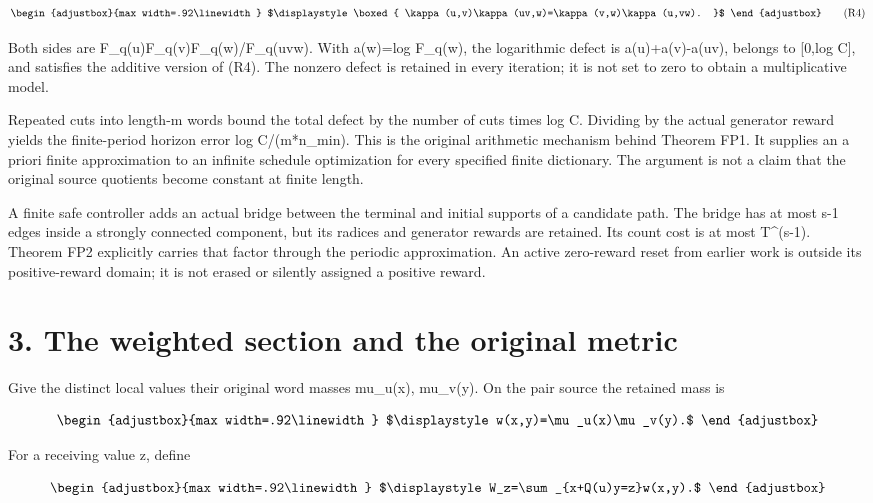 \[
\begin{adjustbox}{max width=.92\linewidth}
$\displaystyle \boxed{
 \kappa(u,v)\kappa(uv,w)=\kappa(v,w)\kappa(u,vw).
 }$
\end{adjustbox}
\tag{R4}
\]

Both sides are F\_q(u)F\_q(v)F\_q(w)/F\_q(uvw). With a(w)=log F\_q(w), the logarithmic defect is a(u)+a(v)-a(uv), belongs to {[}0,log C{]}, and satisfies the additive version of (R4). The nonzero defect is retained in every iteration; it is not set to zero to obtain a multiplicative model.

Repeated cuts into length-m words bound the total defect by the number of cuts times log C. Dividing by the actual generator reward yields the finite-period horizon error log C/(m*n\_min). This is the original arithmetic mechanism behind Theorem FP1. It supplies an a priori finite approximation to an infinite schedule optimization for every specified finite dictionary. The argument is not a claim that the original source quotients become constant at finite length.

A finite safe controller adds an actual bridge between the terminal and initial supports of a candidate path. The bridge has at most s-1 edges inside a strongly connected component, but its radices and generator rewards are retained. Its count cost is at most T\^{}(s-1). Theorem FP2 explicitly carries that factor through the periodic approximation. An active zero-reward reset from earlier work is outside its positive-reward domain; it is not erased or silently assigned a positive reward.

\section{3. The weighted section and the original metric}\label{n29-the-weighted-section-and-the-original-metric}

Give the distinct local values their original word masses mu\_u(x), mu\_v(y). On the pair source the retained mass is

\[
\begin{adjustbox}{max width=.92\linewidth}
$\displaystyle w(x,y)=\mu_u(x)\mu_v(y).$
\end{adjustbox}
\]

For a receiving value z, define

\[
\begin{adjustbox}{max width=.92\linewidth}
$\displaystyle W_z=\sum_{x+Q(u)y=z}w(x,y).$
\end{adjustbox}
\]

